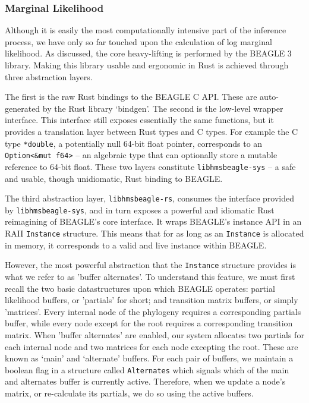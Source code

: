 \documentclass[10pt,journal,compsoc]{IEEEtran}
\begin{document}
\subsubsection{Marginal Likelihood}
  
Although it is easily the most computationally intensive part of the inference process, we have only so far touched upon the calculation of log marginal likelihood. As discussed, the core heavy-lifting is performed by the BEAGLE 3 library. Making this library usable and ergonomic in Rust is achieved through three abstraction layers. 

The first is the raw Rust bindings to the BEAGLE C API. These are auto-generated by the Rust library `bindgen'. The second is the low-level wrapper interface. This interface still exposes essentially the same functions, but it provides a translation layer between Rust types and C types. For example the C type \texttt{*double}, a potentially null 64-bit float pointer, corresponds to an \texttt{Option<\&mut f64>} -- an algebraic type that can optionally store a mutable reference to 64-bit float. These two layers constitute \texttt{libhmsbeagle-sys} -- a safe and usable, though unidiomatic, Rust binding to BEAGLE.

The third abstraction layer, \texttt{libhmsbeagle-rs}, consumes the interface provided by \texttt{libhmsbeagle-sys}, and in turn exposes a powerful and idiomatic Rust reimagining of BEAGLE's core interface. It wraps BEAGLE's instance API in an RAII \texttt{Instance} structure. This means that for as long as an \texttt{Instance} is allocated in memory, it corresponds to a valid and live instance within BEAGLE.

However, the most powerful abstraction that the \texttt{Instance} structure provides is what we refer to as 'buffer alternates'. To understand this feature, we must first recall the two basic datastructures upon which BEAGLE operates: partial likelihood buffers, or 'partials' for short; and transition matrix buffers, or simply 'matrices'. Every internal node of the phylogeny requires a corresponding partials buffer, while every node except for the root requires a corresponding transition matrix. When 'buffer alternates' are enabled, our system allocates two partials for each internal node and two matrices for each node excepting the root. These are known as `main' and `alternate' buffers. For each pair of buffers, we maintain a boolean flag in a structure called \texttt{Alternates} which signals which of the main and alternates buffer is currently active. Therefore, when we update a node's matrix, or re-calculate its partials, we do so using the active buffers.
\end{document}
